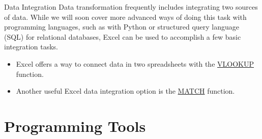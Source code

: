 \documentclass[pdf]{beamer}
\theoremstyle{remark}
\theoremstyle{definition}
\begin{document}
\begin{frame}[t]{Data Integration}
Data transformation frequently includes integrating two sources of data. While we will soon cover more advanced ways of doing this task with programming languages, such as with Python or structured query language (SQL) for relational databases, Excel can be used to accomplish a few basic integration tasks. \\
\vspace{1.5ex}
\begin{itemize}
\item Excel offers a way to connect data in two spreadsheets with the \href{https://support.microsoft.com/en-us/office/vlookup-function-0bbc8083-26fe-4963-8ab8-93a18ad188a1}{VLOOKUP} function. 
\item Another useful Excel data integration option is the \href{https://support.microsoft.com/en-us/office/match-function-e8dffd45-c762-47d6-bf89-533f4a37673a}{MATCH} function.
\end{itemize}
\end{frame}

\section{Programming Tools}
\end{document}

